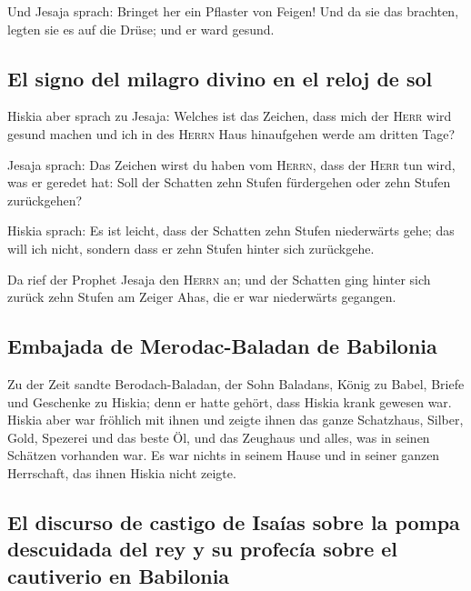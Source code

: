  Und Jesaja sprach: Bringet her ein Pflaster von Feigen!
Und da sie das brachten, legten sie es auf die Drüse; und er ward
gesund.

\hypertarget{el-signo-del-milagro-divino-en-el-reloj-de-sol}{%
\subsection{El signo del milagro divino en el reloj de
sol}\label{el-signo-del-milagro-divino-en-el-reloj-de-sol}}

 Hiskia aber sprach zu Jesaja: Welches ist das Zeichen,
dass mich der \textsc{Herr} wird gesund machen und ich in des
\textsc{Herrn} Haus hinaufgehen werde am dritten Tage?

 Jesaja sprach: Das Zeichen wirst du haben vom
\textsc{Herrn}, dass der \textsc{Herr} tun wird, was er geredet hat:
Soll der Schatten zehn Stufen fürdergehen oder zehn Stufen zurückgehen?

 Hiskia sprach: Es ist leicht, dass der Schatten zehn
Stufen niederwärts gehe; das will ich nicht, sondern dass er zehn Stufen
hinter sich zurückgehe.

 Da rief der Prophet Jesaja den \textsc{Herrn} an; und
der Schatten ging hinter sich zurück zehn Stufen am Zeiger Ahas, die er
war niederwärts gegangen.

\hypertarget{embajada-de-merodac-baladan-de-babilonia}{%
\subsection{Embajada de Merodac-Baladan de
Babilonia}\label{embajada-de-merodac-baladan-de-babilonia}}

 Zu der Zeit sandte Berodach-Baladan, der Sohn Baladans,
König zu Babel, Briefe und Geschenke zu Hiskia; denn er hatte gehört,
dass Hiskia krank gewesen war.  Hiskia aber war fröhlich
mit ihnen und zeigte ihnen das ganze Schatzhaus, Silber, Gold, Spezerei
und das beste Öl, und das Zeughaus und alles, was in seinen Schätzen
vorhanden war. Es war nichts in seinem Hause und in seiner ganzen
Herrschaft, das ihnen Hiskia nicht zeigte.

\hypertarget{el-discurso-de-castigo-de-isauxedas-sobre-la-pompa-descuidada-del-rey-y-su-profecuxeda-sobre-el-cautiverio-en-babilonia}{%
\subsection{El discurso de castigo de Isaías sobre la pompa descuidada
del rey y su profecía sobre el cautiverio en
Babilonia}\label{el-discurso-de-castigo-de-isauxedas-sobre-la-pompa-descuidada-del-rey-y-su-profecuxeda-sobre-el-cautiverio-en-babilonia}}

